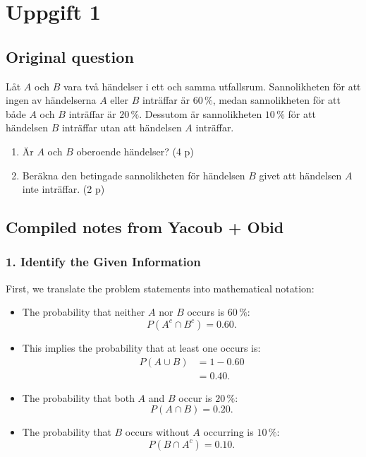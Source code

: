 \documentclass[10pt]{article}
\begin{document}
\section*{Uppgift 1}

\subsection*{Original question}
Låt $A$ och $B$ vara två händelser i ett och samma utfallsrum.
Sannolikheten för att ingen av händelserna $A$ eller $B$ inträffar
är $60\,\%$, medan sannolikheten för att både $A$ och $B$ inträffar
är $20\,\%$. Dessutom är sannolikheten $10\,\%$ för att händelsen
$B$ inträffar utan att händelsen $A$ inträffar.

\begin{enumerate}[label=\alph*)]
\item Är $A$ och $B$ oberoende händelser? \hfill (4 p)
\item Beräkna den betingade sannolikheten för händelsen $B$ givet
att händelsen $A$ inte inträffar. \hfill (2 p)
\end{enumerate}

\subsection*{Compiled notes from Yacoub + Obid}

\subsubsection*{1. Identify the Given Information}
First, we translate the problem statements into
mathematical notation:

\begin{itemize}
\item The probability that neither $A$ nor $B$ occurs is
$60\,\%$:
\[
P(A^c \cap B^c)=0.60.
\]

\item This implies the probability that at least one occurs is:
\begin{align*}
P(A \cup B)
&= 1-0.60 \\[2mm]
&= 0.40.
\end{align*}

\item The probability that both $A$ and $B$ occur is
$20\,\%$:
\[
P(A \cap B)=0.20.
\]

\item The probability that $B$ occurs without $A$ occurring is
$10\,\%$:
\[
P(B \cap A^c)=0.10.
\]
\end{itemize}
\end{document}
